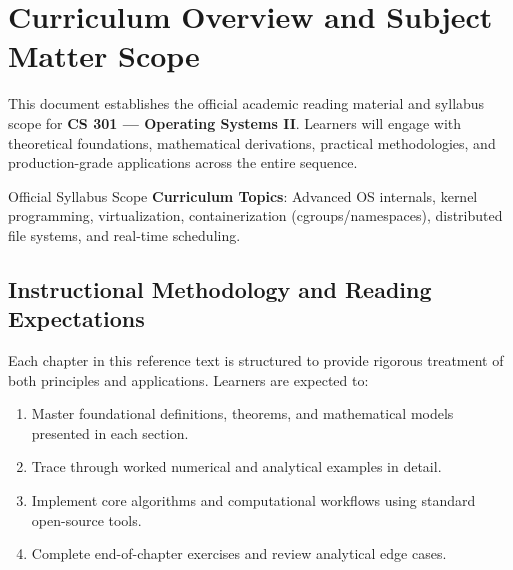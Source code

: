 \section{Curriculum Overview and Subject Matter Scope}

This document establishes the official academic reading material and syllabus scope for \textbf{CS 301 --- Operating Systems II}. Learners will engage with theoretical foundations, mathematical derivations, practical methodologies, and production-grade applications across the entire sequence.

\begin{InsightBox}{Official Syllabus Scope}
  \textbf{Curriculum Topics}: Advanced OS internals, kernel programming, virtualization, containerization (cgroups/namespaces), distributed file systems, and real-time scheduling.
\end{InsightBox}

\subsection{Instructional Methodology and Reading Expectations}

Each chapter in this reference text is structured to provide rigorous treatment of both principles and applications. Learners are expected to:
\begin{enumerate}
  \item Master foundational definitions, theorems, and mathematical models presented in each section.
  \item Trace through worked numerical and analytical examples in detail.
  \item Implement core algorithms and computational workflows using standard open-source tools.
  \item Complete end-of-chapter exercises and review analytical edge cases.
\end{enumerate}

